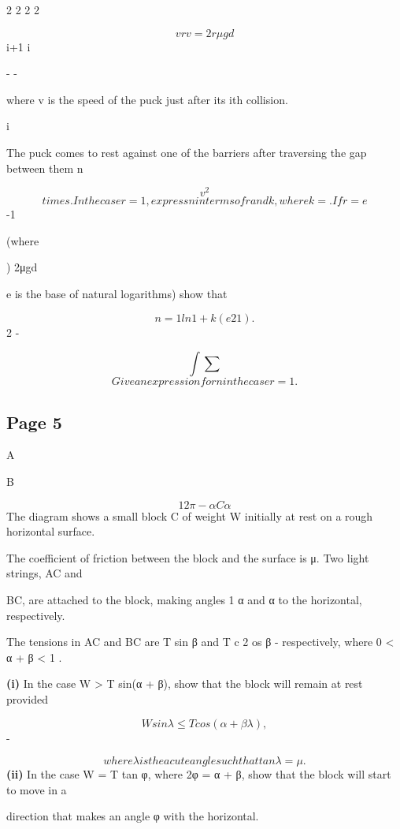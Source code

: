 \documentclass[12pt]{article}
\begin{document}
\begin{flushleft}
2 2 2 2\par
\[v r v = 2r μgd\]
i+1 i\par
- -\par
where v is the speed of the puck just after its ith collision.\par
i\par
The puck comes to rest against one of the barriers after traversing the gap between them n\par
\[v^2\]
\[times. In the case r = 1, express n in terms of r and k, where k = . If r = e\]
-1\par
(where\par
) 2μgd\par
e is the base of natural logarithms) show that\par
\[n = 1 ln 1 + k(e 2 1) .\]
2 -\par
\[\int \sum\]
\[Give an expression for n in the case r = 1.\]
\end{flushleft}
\subsection*{Page 5}
\begin{flushleft}
A\par
B\par
\[1 2 \pi - α C α\]
The diagram shows a small block C of weight W initially at rest on a rough horizontal surface.\par
The coefficient of friction between the block and the surface is μ. Two light strings, AC and\par
BC, are attached to the block, making angles 1 \pi α and α to the horizontal, respectively.\par
The tensions in AC and BC are T sin β and T c 2 os β - respectively, where 0 < α + β < 1 \pi.\par
\textbf{(i)} In the case W > T sin(α + β), show that the block will remain at rest provided\par
\[W sin λ \leq T cos(α + β λ) ,\]
-\par
\[where λ is the acute angle such that tan λ = μ.\]
\textbf{(ii)} In the case W = T tan φ, where 2φ = α + β, show that the block will start to move in a\par
direction that makes an angle φ with the horizontal.\par
\end{flushleft}
\end{document}
